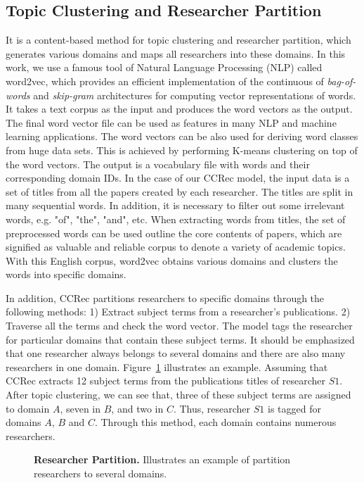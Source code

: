 \documentclass[10pt,letterpaper]{article}
\begin{document}
\subsection*{Topic Clustering and Researcher Partition}
It is a content-based method for topic clustering and researcher partition, which generates various domains and maps all researchers into these domains. In this work, we use a famous tool of Natural Language Processing (NLP) called word2vec, which provides an efficient implementation of the continuous of \emph{bag-of-words} and \emph{skip-gram} architectures for computing vector representations of words. It takes a text corpus as the input and produces the word vectors as the output. The final word vector file can be used as features in many NLP and machine learning applications. The word vectors can be also used for deriving word classes from huge data sets. This is achieved by performing K-means clustering on top of the word vectors. The output is a vocabulary file with words and their corresponding domain IDs. In the case of our CCRec model, the input data is a set of titles from all the papers created by each researcher. The titles are split in many sequential words. In addition, it is necessary to filter out some irrelevant words, e.g. "of", "the", "and", etc. When extracting words from titles, the set of preprocessed words can be used outline the core contents of papers, which are signified as valuable and reliable corpus to denote a variety of academic topics. With this English corpus, word2vec obtains various domains and clusters the words into specific domains.


In addition, CCRec partitions researchers to specific domains through the following methods: 1) Extract subject terms from a researcher's publications. 2) Traverse all the terms and check the word vector. The model tags the researcher for particular domains that contain these subject terms. It should be emphasized that one researcher always belongs to several domains and there are also many researchers in one domain. Figure~\ref{Fig. 2} illustrates an example. Assuming that CCRec extracts 12 subject terms from the publications titles of researcher $S1$. After topic clustering, we can see that, three of these subject terms are assigned to domain $A$, seven in $B$, and two in $C$. Thus, researcher $S1$ is tagged for domains $A$, $B$ and $C$. Through this method, each domain contains numerous researchers.

\begin{figure}[!hbt]
\caption{{\bf Researcher Partition.} Illustrates an example of partition researchers to several domains.}
\label{Fig. 2}
\end{figure}
\end{document}
